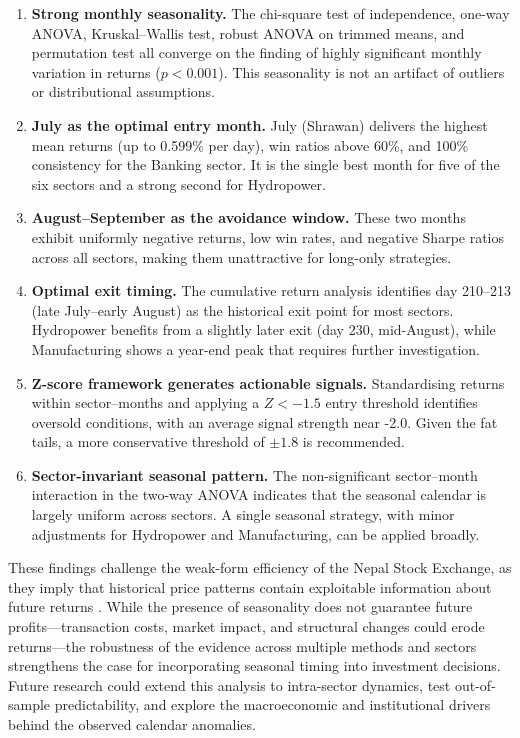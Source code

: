 \documentclass[12pt,a4paper,fleqn]{article}
\begin{document}
\begin{enumerate}
    \item \textbf{Strong monthly seasonality.} The chi-square test of independence, one-way ANOVA, Kruskal–Wallis test, robust ANOVA on trimmed means, and permutation test all converge on the finding of highly significant monthly variation in returns (\(p < 0.001\)). This seasonality is not an artifact of outliers or distributional assumptions.
    
    \item \textbf{July as the optimal entry month.} July (Shrawan) delivers the highest mean returns (up to 0.599\% per day), win ratios above 60\%, and 100\% consistency for the Banking sector. It is the single best month for five of the six sectors and a strong second for Hydropower.
    
    \item \textbf{August–September as the avoidance window.} These two months exhibit uniformly negative returns, low win rates, and negative Sharpe ratios across all sectors, making them unattractive for long-only strategies.
    
    \item \textbf{Optimal exit timing.} The cumulative return analysis identifies day 210–213 (late July–early August) as the historical exit point for most sectors. Hydropower benefits from a slightly later exit (day 230, mid-August), while Manufacturing shows a year-end peak that requires further investigation.
    
    \item \textbf{Z-score framework generates actionable signals.} Standardising returns within sector–months and applying a \(Z < -1.5\) entry threshold identifies oversold conditions, with an average signal strength near -2.0. Given the fat tails, a more conservative threshold of \(\pm 1.8\) is recommended.
    
    \item \textbf{Sector-invariant seasonal pattern.} The non-significant sector–month interaction in the two-way ANOVA indicates that the seasonal calendar is largely uniform across sectors. A single seasonal strategy, with minor adjustments for Hydropower and Manufacturing, can be applied broadly.
\end{enumerate}

These findings challenge the weak-form efficiency of the Nepal Stock Exchange, as they imply that historical price patterns contain exploitable information about future returns \cite{basnet2022efficient, adhikari2024calendar, sharma2021investor}. While the presence of seasonality does not guarantee future profits—transaction costs, market impact, and structural changes could erode returns—the robustness of the evidence across multiple methods and sectors strengthens the case for incorporating seasonal timing into investment decisions. Future research could extend this analysis to intra-sector dynamics, test out-of-sample predictability, and explore the macroeconomic and institutional drivers behind the observed calendar anomalies.
\end{document}

